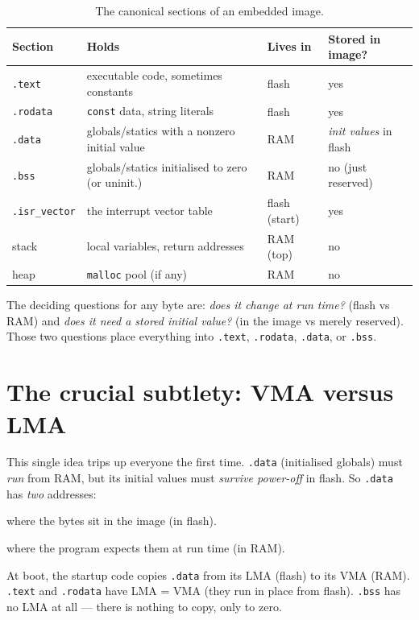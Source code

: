 \documentclass[11pt,a4paper,oneside]{book}
\newcommand{\code}[1]{\texttt{#1}}
\begin{document}
\begin{table}[h]
\centering
\caption{The canonical sections of an embedded image.}
\label{tab:sections}
\small
\begin{tabular}{@{}llll@{}}
\toprule
\textbf{Section} & \textbf{Holds} & \textbf{Lives in} & \textbf{Stored in image?}\\
\midrule
\code{.text}    & executable code, sometimes constants & flash & yes\\
\code{.rodata}  & \code{const} data, string literals & flash & yes\\
\code{.data}    & globals/statics with a nonzero initial value & RAM & \emph{init values} in flash\\
\code{.bss}     & globals/statics initialised to zero (or uninit.) & RAM & no (just reserved)\\
\code{.isr\_vector} & the interrupt vector table & flash (start) & yes\\
stack           & local variables, return addresses & RAM (top) & no\\
heap            & \code{malloc} pool (if any) & RAM & no\\
\bottomrule
\end{tabular}
\end{table}

\begin{keyidea}
The deciding questions for any byte are: \emph{does it change at run time?}
(flash vs RAM) and \emph{does it need a stored initial value?} (in the image vs
merely reserved). Those two questions place everything into \code{.text},
\code{.rodata}, \code{.data}, or \code{.bss}.
\end{keyidea}

\section{The crucial subtlety: VMA versus LMA}
This single idea trips up everyone the first time. \code{.data} (initialised
globals) must \emph{run} from RAM, but its initial values must \emph{survive
power-off} in flash. So \code{.data} has \emph{two} addresses:
\begin{description}[leftmargin=1.5cm,style=nextline]
  \item[LMA --- Load Memory Address] where the bytes sit in the image (in flash).
  \item[VMA --- Virtual/run Memory Address] where the program expects them at
        run time (in RAM).
\end{description}
At boot, the startup code copies \code{.data} from its LMA (flash) to its VMA
(RAM). \code{.text} and \code{.rodata} have LMA = VMA (they run in place from
flash). \code{.bss} has no LMA at all --- there is nothing to copy, only to
zero.
\end{document}
